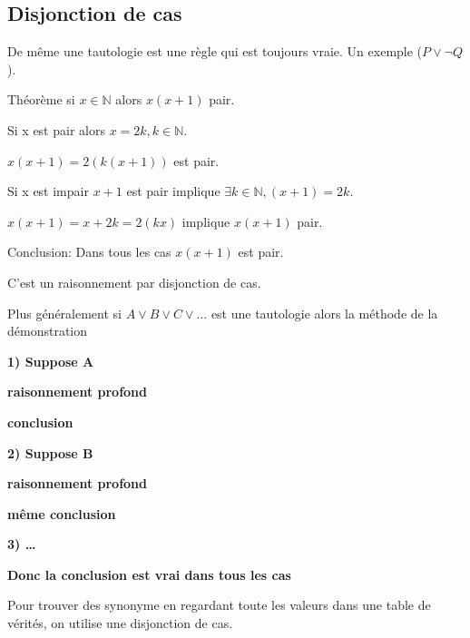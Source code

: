\documentclass[a4paper, 12pt]{article}
\begin{document}
\subsection{Disjonction de cas}

De même une tautologie est une règle qui est toujours vraie. Un exemple ($P \lor \neg Q$).

\begin{example}
    Théorème si $x \in \mathbb{N}$ alors $x(x + 1)$ pair.

    \vspace{1em}

    Si x est pair alors $x = 2k, k \in \mathbb{N}$.

    $x(x + 1) = 2(k(x + 1))$ est pair.

    \vspace{1em}

    Si x est impair $x + 1$ est pair implique $\exists k \in \mathbb{N}, (x + 1) = 2k$.

    $x(x + 1) = x + 2k = 2(kx)$ implique $x(x + 1)$ pair.

    \vspace{1em}

    Conclusion: Dans tous les cas $x(x + 1)$ est pair.
    
    C'est un raisonnement par disjonction de cas.
\end{example}

\begin{methode}
    Plus généralement si $A \lor B \lor C \lor ...$ est une tautologie alors la méthode de la démonstration

    \vspace{0.5em}

    \item \textbf{1) Suppose A}
    \item \textbf{raisonnement profond}
    \item \textbf{conclusion}
    \item \textbf{2) Suppose B}
    \item \textbf{raisonnement profond}
    \item \textbf{même conclusion}
    \item \textbf{3) \ldots}
    \item \textbf{Donc la conclusion est vrai dans tous les cas}
\end{methode}

\begin{remark}
    Pour trouver des synonyme en regardant toute les valeurs dans une table de vérités, on utilise une disjonction de cas.
\end{remark}
\end{document}
